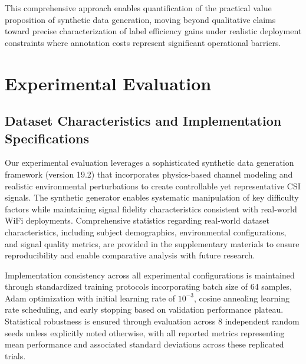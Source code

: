 \documentclass[10pt,conference]{IEEEtran}
\begin{document}
This comprehensive approach enables quantification of the practical value proposition of synthetic data generation, moving beyond qualitative claims toward precise characterization of label efficiency gains under realistic deployment constraints where annotation costs represent significant operational barriers.

\section{Experimental Evaluation}

\subsection{Dataset Characteristics and Implementation Specifications}

Our experimental evaluation leverages a sophisticated synthetic data generation framework (version 19.2) that incorporates physics-based channel modeling and realistic environmental perturbations to create controllable yet representative CSI signals. The synthetic generator enables systematic manipulation of key difficulty factors while maintaining signal fidelity characteristics consistent with real-world WiFi deployments. Comprehensive statistics regarding real-world dataset characteristics, including subject demographics, environmental configurations, and signal quality metrics, are provided in the supplementary materials to ensure reproducibility and enable comparative analysis with future research.

Implementation consistency across all experimental configurations is maintained through standardized training protocols incorporating batch size of 64 samples, Adam optimization with initial learning rate of $10^{-3}$, cosine annealing learning rate scheduling, and early stopping based on validation performance plateau. Statistical robustness is ensured through evaluation across 8 independent random seeds unless explicitly noted otherwise, with all reported metrics representing mean performance and associated standard deviations across these replicated trials.
\end{document}
